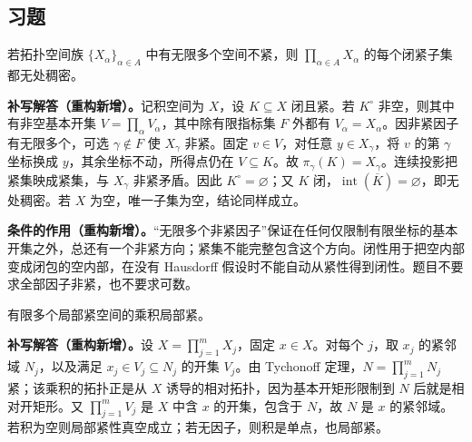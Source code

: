 \documentclass[../../main.tex]{subfiles}%
\begin{document}
\subsection*{习题}
\begin{exercise}\label{exercise:ch04-product-nowhere-dense}
若拓扑空间族 $\{X_\alpha\}_{\alpha\in A}$ 中有无限多个空间不紧，则 $\prod_{\alpha\in A}X_\alpha$ 的每个闭紧子集都无处稠密。
\end{exercise}
\begin{solution}
\textbf{补写解答（重构新增）。}记积空间为 $X$，设 $K\subseteq X$ 闭且紧。若 $K^\circ$ 非空，则其中有非空基本开集 $V=\prod_\alpha V_\alpha$，其中除有限指标集 $F$ 外都有 $V_\alpha=X_\alpha$。因非紧因子有无限多个，可选 $\gamma\notin F$ 使 $X_\gamma$ 非紧。固定 $v\in V$，对任意 $y\in X_\gamma$，将 $v$ 的第 $\gamma$ 坐标换成 $y$，其余坐标不动，所得点仍在 $V\subseteq K$。故 $\pi_\gamma(K)=X_\gamma$。连续投影把紧集映成紧集，与 $X_\gamma$ 非紧矛盾。因此 $K^\circ=\varnothing$；又 $K$ 闭，$\operatorname{int}(\overline K)=\varnothing$，即无处稠密。若 $X$ 为空，唯一子集为空，结论同样成立。
\end{solution}
\begin{remark}
\textbf{条件的作用（重构新增）。}“无限多个非紧因子”保证在任何仅限制有限坐标的基本开集之外，总还有一个非紧方向；紧集不能完整包含这个方向。闭性用于把空内部变成闭包的空内部，在没有 Hausdorff 假设时不能自动从紧性得到闭性。题目不要求全部因子非紧，也不要求可数。
\end{remark}
\begin{exercise}\label{exercise:ch04-finite-locally-compact-product}
有限多个局部紧空间的乘积局部紧。
\end{exercise}
\begin{solution}
\textbf{补写解答（重构新增）。}设 $X=\prod_{j=1}^mX_j$，固定 $x\in X$。对每个 $j$，取 $x_j$ 的紧邻域 $N_j$，以及满足 $x_j\in V_j\subseteq N_j$ 的开集 $V_j$。由 Tychonoff 定理，$N=\prod_{j=1}^mN_j$ 紧；该乘积的拓扑正是从 $X$ 诱导的相对拓扑，因为基本开矩形限制到 $N$ 后就是相对开矩形。又 $\prod_{j=1}^mV_j$ 是 $X$ 中含 $x$ 的开集，包含于 $N$，故 $N$ 是 $x$ 的紧邻域。若积为空则局部紧性真空成立；若无因子，则积是单点，也局部紧。
\end{solution}
\end{document}
